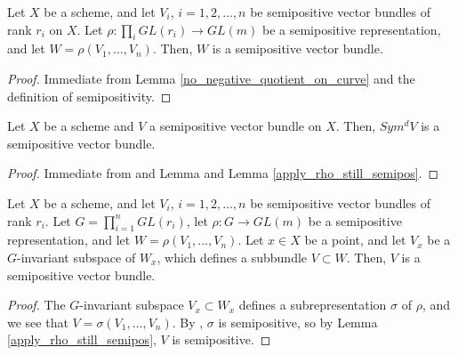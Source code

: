 \begin{lemma}\label{apply_rho_still_semipos}
Let $X$ be a scheme, and let $V_i$, $i=1,2,\ldots,n$ be semipositive vector bundles of rank $r_i$ on $X$. 
Let $\rho:\prod_i GL(r_i)\to GL(m)$ be a semipositive representation, and let $W=\rho(V_1,\ldots,V_n)$. 
Then, $W$ is a semipositive vector bundle.
\end{lemma}

\begin{proof}
Immediate from Lemma \ref{no_negative_quotient_on_curve} and the definition of semipositivity.
\end{proof}

\begin{lemma}
Let $X$ be a scheme and $V$ a semipositive vector bundle on $X$. 
Then, $Sym^dV$ is a semipositive vector bundle.
\end{lemma}

\begin{proof}
Immediate from and Lemma  and Lemma \ref{apply_rho_still_semipos}.
\end{proof}

\begin{lemma}
Let $X$ be a scheme, and let $V_i$, $i=1,2,\ldots,n$ be semipositive vector bundles of rank $r_i$. 
Let $G=\prod_{i=1}^{n}GL(r_i)$, let $\rho:G\to GL(m)$ be a semipositive representation, and let $W=\rho(V_1,\ldots,V_n)$. Let $x\in X$ be a point, and let $V_x$ be a $G$-invariant subspace of $W_x$, which defines a subbundle $V\subset W$. 
Then, $V$ is a semipositive vector bundle.
\end{lemma}

\begin{proof}
The $G$-invariant subspace $V_x\subset W_x$ defines a subrepresentation $\sigma$ of $\rho$, and we see that $V=\sigma(V_1,\ldots,V_n)$.
 By , $\sigma$ is semipositive, so by Lemma \ref{apply_rho_still_semipos}, $V$ is semipositive.
\end{proof}







